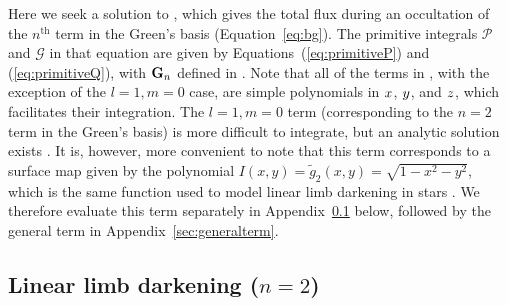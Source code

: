 \documentclass[modern]{aastex61}
\begin{document}
Here we seek a solution to , which gives the total flux
during an occultation of the $n^\mathrm{th}$ term in the Green's basis
(Equation~\ref{eq:bg}). The primitive integrals $\mathcal{P}$ and
$\mathcal{G}$ in that equation are given by Equations~(\ref{eq:primitiveP})
and (\ref{eq:primitiveQ}), with
${\mathbf{G}}_n$ defined in . Note that all of the terms in ,
with the exception of the $l = 1, m = 0$ case, are simple polynomials
in $\mbox{$x$}$, $\mbox{$y$}$, and $\mbox{$z$}$, which facilitates their integration.
The $l = 1, m = 0$ term (corresponding to the $n = 2$ term in the Green's basis)
is more difficult to integrate, but an analytic
solution exists \citep{Pal2012}. It is, however, more convenient
to note that this term corresponds to a surface map given by the polynomial
$I(x, y) = \tilde{g}_2(x, y) = \sqrt{1 - x^2 - y^2}$, which is the same function used
to model linear limb darkening in stars \citep{MandelAgol2002}. We therefore
evaluate this term separately in Appendix~\ref{sec:linearld} below, followed by
the general term in Appendix~\ref{sec:generalterm}.

\subsection{Linear limb darkening ($n = 2$)}
\label{sec:linearld}
\end{document}
